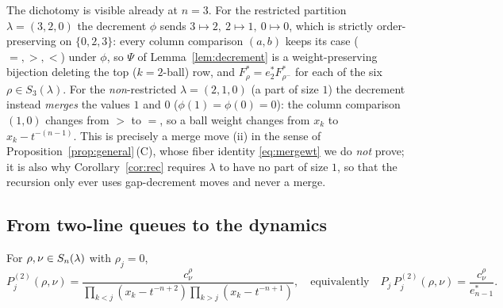 \begin{qthreeremark}
The dichotomy is visible already at $n=3$. For the restricted partition
$\lambda=(3,2,0)$ the decrement $\phi$ sends $3\mapsto2,\ 2\mapsto1,\ 0\mapsto0$,
which is strictly order-preserving on $\{0,2,3\}$: every column comparison
$(a,b)$ keeps its case ($=,>,<$) under $\phi$, so $\Psi$ of
Lemma~\ref{lem:decrement} is a weight-preserving bijection deleting the top
($k=2$-ball) row, and $F^*_\rho=e^*_2 F^*_{\rho^-}$ for each of the six
$\rho\in S_3(\lambda)$. For the \emph{non}-restricted $\lambda=(2,1,0)$ (a part of
size $1$) the decrement instead \emph{merges} the values $1$ and $0$
($\phi(1)=\phi(0)=0$): the column comparison $(1,0)$ changes from $>$ to $=$, so a
ball weight changes from $x_k$ to $x_k-t^{-(n-1)}$. This is precisely a merge move
\textup{(ii)} in the sense of Proposition~\ref{prop:general}\,\textup{(C)}, whose
fiber identity \eqref{eq:mergewt} we do \emph{not} prove; it is also why
Corollary~\ref{cor:rec} requires $\lambda$ to have no part of size $1$, so that the
recursion only ever uses gap-decrement moves and never a merge.
\end{qthreeremark}

\subsection*{From two-line queues to the dynamics}

\begin{qthreeproposition}\label{prop:step2}
For $\rho,\nu\in S_n(\lambda)$ with $\rho_j=0$,
\[
P^{(2)}_j(\rho,\nu)=\frac{c^\rho_\nu}{\prod_{k<j}(x_k-t^{-n+2})\prod_{k>j}(x_k-t^{-n+1})},
\quad\text{equivalently}\quad
P_j\,P^{(2)}_j(\rho,\nu)=\frac{c^\rho_\nu}{e^*_{n-1}} .
\]
\end{qthreeproposition}

